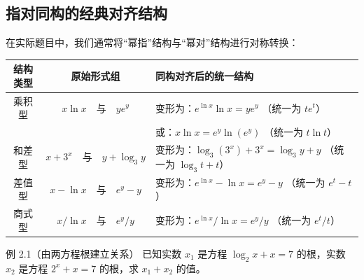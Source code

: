 \documentclass[11pt,a4paper]{ctexart}
\begin{document}
\subsection{指对同构的经典对齐结构}
在实际题目中，我们通常将“幂指”结构与“幂对”结构进行对称转换：
\begin{center}
\renewcommand{\arraystretch}{1.3}
\begin{tabularx}{0.95\linewidth}{c c X}
\toprule
结构类型 & 原始形式组 & 同构对齐后的统一结构 \\
\midrule
乘积型 & $x \ln x \quad \text{与} \quad y e^y$ & 变形为：$e^{\ln x}\ln x = y e^y$ （统一为 $t e^t$） \\
 & & 或：$x \ln x = e^y \ln(e^y)$ （统一为 $t \ln t$） \\
\midrule
和差型 & $x + 3^x \quad \text{与} \quad y + \log_3 y$ & 变形为：$\log_3(3^x) + 3^x = \log_3 y + y$ （统一为 $\log_3 t + t$） \\
\midrule
差值型 & $x - \ln x \quad \text{与} \quad e^y - y$ & 变形为：$e^{\ln x} - \ln x = e^y - y$ （统一为 $e^t - t$） \\
\midrule
商式型 & $x / \ln x \quad \text{与} \quad e^y / y$ & 变形为：$e^{\ln x} / \ln x = e^y / y$ （统一为 $e^t / t$） \\
\bottomrule
\end{tabularx}
\end{center}

\newpage

\begin{exbox}{例 2.1（由两方程根建立关系）}
已知实数 $x_1$ 是方程 $\log_2 x + x = 7$ 的根，实数 $x_2$ 是方程 $2^x + x = 7$ 的根，求 $x_1 + x_2$ 的值。
\end{exbox}
\end{document}
